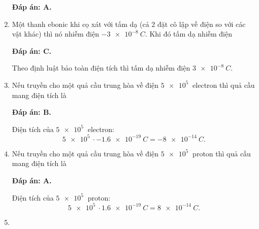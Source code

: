 \begin{enumerate}[label=\bfseries Câu \arabic*:]
{	}
	\loigiai
	{	\textbf{Đáp án: A.}
		
	}
	\item {}
	
	\cauhoi
	{Một thanh ebonic khi cọ xát với tấm dạ (cả 2 đặt cô lập về điện so với các vật khác) thì nó nhiễm điện $\SI{-3e-8}{C}$. Khi đó tấm dạ nhiễm điện
		
	}
	\loigiai
	{	\textbf{Đáp án: C.}
		
		Theo định luật bảo toàn điện tích thì tấm dạ nhiễm điện $\SI{3e-8}{C}$.
	}
	\item {}
	
	\cauhoi
	{Nếu truyền cho một quả cầu trung hòa về điện $\SI{5e5}{}$ electron thì quả cầu mang điện tích là
		
	}
	\loigiai
	{	\textbf{Đáp án: B.}
		
		Điện tích của $\SI{5e5}{}$ electron:
		$$\SI{5e5}{} \cdot \SI{-1.6e-19}{C} = \SI{-8e-14}{C}.$$
	}
	\item {}
	
	\cauhoi
	{Nếu truyền cho một quả cầu trung hòa về điện $\SI{5e5}{}$ proton thì quả cầu mang điện tích là
		
	}
	\loigiai
	{	\textbf{Đáp án: A.}
		
		Điện tích của $\SI{5e5}{}$ proton:
		$$\SI{5e5}{} \cdot \SI{1.6e-19}{C} = \SI{8e-14}{C}.$$
	}
	\item {}
	

\end{enumerate}
